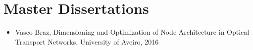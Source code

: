 
%
%
%


\chapter{Master Dissertations}
\begin{itemize}
    \item{Vasco Braz, Dimensioning and Optimization of Node Architecture in Optical Transport Networks, University of Aveiro, 2016}\\
\end{itemize}

\cleardoublepage
{}


%
%





